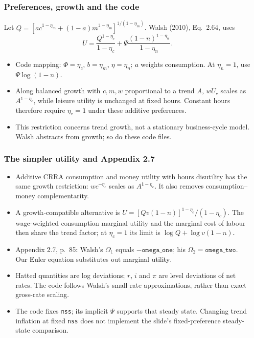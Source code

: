 \documentclass[handout]{beamer}
\begin{document}
\begin{frame}
\frametitle{Preferences, growth and the code}
\small
Let $Q=[ac^{1-\eta_m}+(1-a)m^{1-\eta_m}]^{1/(1-\eta_m)}$.
Walsh (2010), Eq.~2.64, uses
\[
 U=\frac{Q^{1-\eta_c}}{1-\eta_c}
   +\Psi\frac{(1-n)^{1-\eta_n}}{1-\eta_n}.
\]
\begin{itemize}
\item Code mapping: $\Phi=\eta_c$, $b=\eta_m$, $\eta=\eta_n$;
$a$ weights consumption. At $\eta_n=1$, use $\Psi\log(1-n)$.
\item Along balanced growth with $c,m,w$ proportional to a trend $A$,
$wU_c$ scales as $A^{1-\eta_c}$, while leisure utility is unchanged
at fixed hours. Constant hours therefore require $\eta_c=1$
under these additive preferences.
\item This restriction concerns trend growth, not a stationary business-cycle
model. Walsh abstracts from growth; so do these code files.
\end{itemize}
\end{frame}

\begin{frame}
\frametitle{The simpler utility and Appendix 2.7}
\footnotesize
\begin{itemize}
\item Additive CRRA consumption and money utility with hours disutility
has the same growth restriction: $w c^{-\eta_c}$ scales as
$A^{1-\eta_c}$. It also removes consumption--money complementarity.
\item A growth-compatible alternative is
$U=[Qv(1-n)]^{1-\eta_c}/(1-\eta_c)$.
The wage-weighted consumption marginal utility and the marginal cost of labour then share the trend factor;
at $\eta_c=1$ its limit is $\log Q+\log v(1-n)$.
\item Appendix 2.7, p.~85: Walsh's $\Omega_1$ equals
$-\texttt{omega\_one}$; his $\Omega_2=\texttt{omega\_two}$.
Our Euler equation substitutes out marginal utility.
\item Hatted quantities are log deviations; $r$, $i$ and $\pi$ are
level deviations of net rates. The code follows Walsh's small-rate
approximations, rather than exact gross-rate scaling.
\item The code fixes \texttt{nss}; its implicit $\Psi$ supports that
steady state. Changing trend inflation at fixed \texttt{nss} does not
implement the slide's fixed-preference steady-state comparison.
\end{itemize}
\end{frame}
\end{document}
